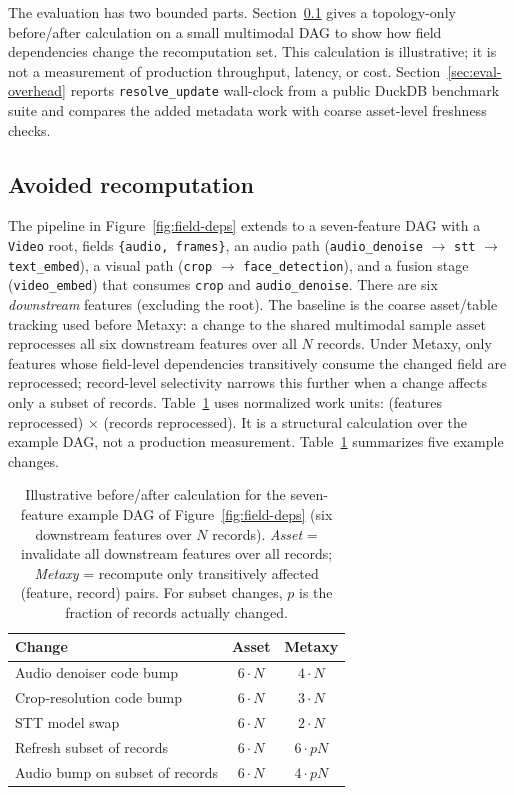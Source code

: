 \documentclass[sigconf]{acmart}
\begin{document}
The evaluation has two bounded parts.
Section~\ref{sec:eval-savings} gives a topology-only before/after calculation on a small multimodal DAG to show how field dependencies change the recomputation set.
This calculation is illustrative; it is not a measurement of production throughput, latency, or cost.
Section~\ref{sec:eval-overhead} reports \texttt{resolve\_update} wall-clock from a public DuckDB benchmark suite and compares the added metadata work with coarse asset-level freshness checks.

\subsection{Avoided recomputation}
\label{sec:eval-savings}

The pipeline in Figure~\ref{fig:field-deps} extends to a seven-feature DAG with a \texttt{Video} root, fields \texttt{\{audio, frames\}}, an audio path (\texttt{audio\_denoise} $\to$ \texttt{stt} $\to$ \texttt{text\_embed}), a visual path (\texttt{crop} $\to$ \texttt{face\_detection}), and a fusion stage (\texttt{video\_embed}) that consumes \texttt{crop} and \texttt{audio\_denoise}.
There are six \emph{downstream} features (excluding the root).
The baseline is the coarse asset/table tracking used before Metaxy: a change to the shared multimodal sample asset reprocesses all six downstream features over all $N$ records.
Under Metaxy, only features whose field-level dependencies transitively consume the changed field are reprocessed; record-level selectivity narrows this further when a change affects only a subset of records.
Table~\ref{tab:savings} uses normalized work units: (features reprocessed) $\times$ (records reprocessed).
It is a structural calculation over the example DAG, not a production measurement.
Table~\ref{tab:savings} summarizes five example changes.

\begin{table}[t]
\centering
\caption{Illustrative before/after calculation for the seven-feature example DAG of Figure~\ref{fig:field-deps} (six downstream features over $N$ records). \emph{Asset} = invalidate all downstream features over all records; \emph{Metaxy} = recompute only transitively affected (feature, record) pairs. For subset changes, $p$ is the fraction of records actually changed.}
\label{tab:savings}
\small
\begin{tabular}{@{}lcc@{}}
\toprule
Change                                & Asset           & Metaxy       \\
\midrule
Audio denoiser code bump              & $6 \cdot N$     & $4 \cdot N$  \\
Crop-resolution code bump             & $6 \cdot N$     & $3 \cdot N$  \\
STT model swap                        & $6 \cdot N$     & $2 \cdot N$  \\
Refresh subset of records             & $6 \cdot N$     & $6 \cdot pN$ \\
Audio bump on subset of records       & $6 \cdot N$     & $4 \cdot pN$ \\
\bottomrule
\end{tabular}
\end{table}
\end{document}
